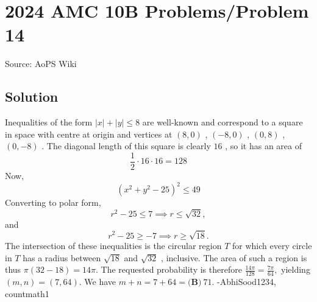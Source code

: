 \documentclass[12pt]{article}
\begin{document}
\section*{{2024 AMC 10B Problems/Problem 14}}
Source: AoPS Wiki

\subsection*{Solution}
Inequalities of the form $|x|+|y| \le 8$ are well-known and correspond to a square in space with centre at origin and vertices at $(8, 0)$ , $(-8, 0)$ , $(0, 8)$ , $(0, -8)$ .
The diagonal length of this square is clearly $16$ , so it has an area of \[\frac{1}{2} \cdot 16 \cdot 16 = 128\] Now, \[(x^2 + y^2 - 25)^2 \le 49\] Converting to polar form, \[r^2 - 25 \le 7 \implies r \le \sqrt{32},\] and \[r^2 - 25 \ge -7\implies r\ge \sqrt{18}.\] The intersection of these inequalities is the circular region $T$ for which every circle in $T$ has a radius between $\sqrt{18}$ and $\sqrt{32}$ , inclusive. The area of such a region is thus $\pi(32-18)=14\pi.$ The requested probability is therefore $\frac{14\pi}{128} = \frac{7\pi}{64},$ yielding $(m,n)=(7,64).$ We have $m+n=7+64=\boxed{\textbf{(B)}\ 71}.$ -AbhiSood1234, countmath1
\end{document}

